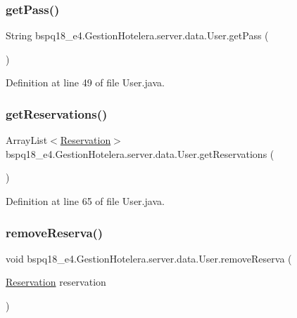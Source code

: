 \subsubsection{\texorpdfstring{get\+Pass()}{getPass()}}
{\footnotesize\ttfamily String bspq18\+\_\+e4.\+Gestion\+Hotelera.\+server.\+data.\+User.\+get\+Pass (\begin{DoxyParamCaption}{ }\end{DoxyParamCaption})}



Definition at line 49 of file User.\+java.

\mbox{\label{classbspq18__e4_1_1_gestion_hotelera_1_1server_1_1data_1_1_user_ab5fd3873a45e5d2f997c9b3d9173141c}} 
\subsubsection{\texorpdfstring{get\+Reservations()}{getReservations()}}
{\footnotesize\ttfamily Array\+List$<$\mbox{\hyperlink{classbspq18__e4_1_1_gestion_hotelera_1_1server_1_1data_1_1_reservation}{Reservation}}$>$ bspq18\+\_\+e4.\+Gestion\+Hotelera.\+server.\+data.\+User.\+get\+Reservations (\begin{DoxyParamCaption}{ }\end{DoxyParamCaption})}



Definition at line 65 of file User.\+java.

\mbox{\label{classbspq18__e4_1_1_gestion_hotelera_1_1server_1_1data_1_1_user_a896e888a97f18b08ff6e8b7b0da7b15e}} 
\subsubsection{\texorpdfstring{remove\+Reserva()}{removeReserva()}}
{\footnotesize\ttfamily void bspq18\+\_\+e4.\+Gestion\+Hotelera.\+server.\+data.\+User.\+remove\+Reserva (\begin{DoxyParamCaption}\item[{\mbox{\hyperlink{classbspq18__e4_1_1_gestion_hotelera_1_1server_1_1data_1_1_reservation}{Reservation}}}]{reservation }\end{DoxyParamCaption})}




